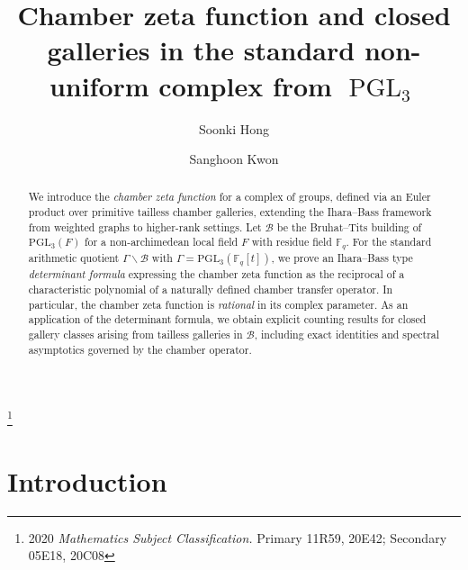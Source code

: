 \documentclass[11pt]{amsart}
\theoremstyle{definition}
\theoremstyle{remark}
\numberwithin{equation}{section}
\begin{document}
\title[Chamber zeta function of $\operatorname{PGL}_3$]{Chamber zeta function and closed galleries in the standard non-uniform complex from $\operatorname{PGL}_3$}
\author{Soonki Hong}
\address{Department of Mathematical Education\\Catholic Kwandong University\\Beomil-ro, Gangneung 25601, Republic of Korea}
\author{Sanghoon Kwon}
\address{Department of Mathematical Education\\Catholic Kwandong University\\Beomil-ro, Gangneung 25601, Republic of Korea}

\thanks{2020 \emph{Mathematics Subject Classification.} Primary 11R59, 20E42; Secondary 05E18, 20C08}
\maketitle

\begin{abstract}
We introduce the \emph{chamber zeta function} for a complex of groups, defined via an Euler product over primitive tailless chamber galleries, extending the Ihara--Bass framework from weighted graphs to higher-rank settings. Let $\mathcal{B}$ be the Bruhat--Tits building of $\mathrm{PGL}_{3}(F)$ for a non-archimedean local field $F$ with residue field $\mathbb{F}_{q}$. For the standard arithmetic quotient $\Gamma\backslash\mathcal{B}$ with $\Gamma=\mathrm{PGL}_{3}(\mathbb{F}_{q}[t])$, we prove an Ihara--Bass type \emph{determinant formula} expressing the chamber zeta function as the reciprocal of a characteristic polynomial of a naturally defined chamber transfer operator. In particular, the chamber zeta function is \emph{rational} in its complex parameter. As an application of the determinant formula, we obtain explicit counting results for closed gallery classes arising from tailless galleries in $\mathcal{B}$, including exact identities and spectral asymptotics governed by the chamber operator.
\end{abstract}


\tableofcontents

\section{Introduction}
\end{document}
